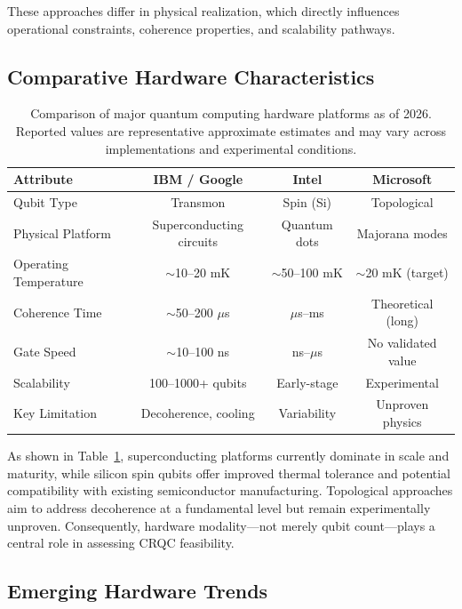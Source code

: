 \documentclass[11pt,a4paper]{article}
\begin{document}
These approaches differ in physical realization, which directly influences operational constraints, coherence properties, and scalability pathways.

\subsection{Comparative Hardware Characteristics}

\begin{table}[h]
\centering
\caption{Comparison of major quantum computing hardware platforms as of 2026. Reported values are representative approximate estimates and may vary across implementations and experimental conditions.}
\label{tab:quantum_hardware_comparison}
\begin{tabular}{lccc}
\toprule
\textbf{Attribute} & \textbf{IBM / Google} & \textbf{Intel} & \textbf{Microsoft} \\
\midrule
Qubit Type & Transmon & Spin (Si) & Topological \\
Physical Platform & Superconducting circuits & Quantum dots & Majorana modes \\
Operating Temperature & $\sim$10--20 mK & $\sim$50--100 mK & $\sim$20 mK (target) \\
Coherence Time & $\sim$50--200 $\mu$s & $\mu$s--ms & Theoretical (long) \\
Gate Speed & $\sim$10--100 ns & ns--$\mu$s & No validated value \\
Scalability & 100--1000+ qubits & Early-stage & Experimental \\
Key Limitation & Decoherence, cooling & Variability & Unproven physics \\
\bottomrule
\end{tabular}
\end{table}

\noindent
As shown in Table~\ref{tab:quantum_hardware_comparison}, superconducting platforms currently dominate in scale and maturity, while silicon spin qubits offer improved thermal tolerance and potential compatibility with existing semiconductor manufacturing. Topological approaches aim to address decoherence at a fundamental level but remain experimentally unproven. Consequently, hardware modality—not merely qubit count—plays a central role in assessing CRQC feasibility.

\subsection{Emerging Hardware Trends}
\end{document}
